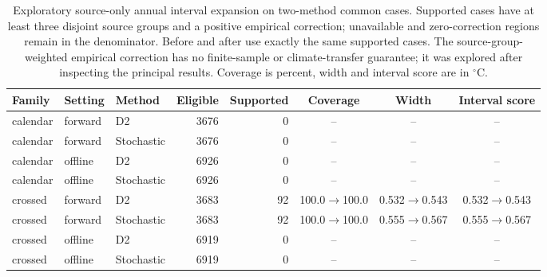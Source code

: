 \begin{table}[p]\centering\scriptsize
\caption{Exploratory source-only annual interval expansion on two-method common cases. Supported cases have at least three disjoint source groups and a positive empirical correction; unavailable and zero-correction regions remain in the denominator. Before and after use exactly the same supported cases. The source-group-weighted empirical correction has no finite-sample or climate-transfer guarantee; it was explored after inspecting the principal results. Coverage is percent, width and interval score are in $^{\circ}$C.}\label{tab:annual-expansion}
\begin{tabular}{lllrrccc}\toprule
Family & Setting & Method & Eligible & Supported & Coverage & Width & Interval score\\\midrule
calendar & forward & D2 & 3676 & 0 & -- & -- & --\\
calendar & forward & Stochastic & 3676 & 0 & -- & -- & --\\
calendar & offline & D2 & 6926 & 0 & -- & -- & --\\
calendar & offline & Stochastic & 6926 & 0 & -- & -- & --\\
crossed & forward & D2 & 3683 & 92 & 100.0$\to$100.0 & 0.532$\to$0.543 & 0.532$\to$0.543\\
crossed & forward & Stochastic & 3683 & 92 & 100.0$\to$100.0 & 0.555$\to$0.567 & 0.555$\to$0.567\\
crossed & offline & D2 & 6919 & 0 & -- & -- & --\\
crossed & offline & Stochastic & 6919 & 0 & -- & -- & --\\
\bottomrule\end{tabular}
\end{table}
